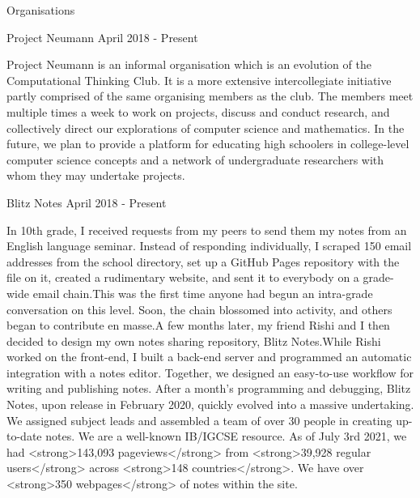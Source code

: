 \documentclass{resume} %
\begin{document}
\begin{rSection}{Organisations}


\begin{rSubsection}{ Project Neumann }{ April 2018 - Present }{}
\item \n            Project Neumann is an informal organisation which is an evolution of the Computational Thinking Club. It is a more extensive intercollegiate initiative partly comprised of the same organising members as the club. The members meet multiple times a week to work on projects, discuss and conduct research, and collectively direct our explorations of computer science and mathematics. In the future, we plan to provide a platform for educating high schoolers in college-level computer science concepts and a network of undergraduate researchers with whom they may undertake projects.\n        

\end{rSubsection}



\begin{rSubsection}{ Blitz Notes }{ April 2018 - Present }{}
\item \n        \n        In 10th grade, I received requests from my peers  to send them my notes from an English language seminar. Instead of responding individually, I scraped 150 email addresses from the school directory, set up a GitHub Pages repository with the file on it, created a rudimentary website, and sent it to everybody on a grade-wide email chain.\n        This was the first time anyone had begun an intra-grade conversation on this level. Soon, the chain blossomed into activity, and others began to contribute en masse.\n        A few months later, my friend Rishi and I then decided to design my own notes sharing repository, Blitz Notes.\n        While Rishi worked on the front-end, I built a back-end server and programmed an automatic integration with a notes editor. Together, we designed an easy-to-use workflow for writing and publishing notes. After a month’s programming and debugging, Blitz Notes, upon release in February 2020, quickly evolved into a massive undertaking. We assigned subject leads and assembled a team of over 30 people in creating up-to-date notes. We are a well-known IB/IGCSE resource. As of July 3rd 2021, we had <strong>143,093 pageviews</strong> from <strong>39,928 regular users</strong> across <strong>148 countries</strong>. We have over <strong>350 webpages</strong> of notes within the site.\n        

\end{rSubsection}




\end{rSection}
\end{document}
